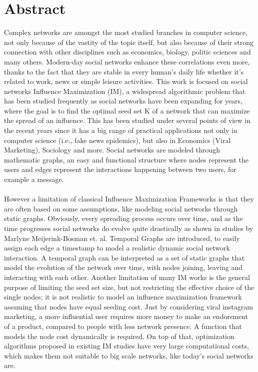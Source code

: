 \chapter*{Abstract} %
\label{abtract}

Complex networks are amongst the most studied branches in computer science, not only because of the vastity of the topic itself, but also because of their strong connection with other disciplines such as economics, biology, politic sciences and many others. Modern-day social networks enhance these correlations even more, thanks to the fact that they are stable in every human's daily life whether it's related to work, news or simple leisure activities. This work is focused on social networks Influence Maximization (IM), a widespread algorithmic problem that has been studied frequently as social networks have been expanding for years, where the goal is to find the optimal seed set K of a network that can maximize the spread of an influence. This has been studied under several points of view in the recent years since it has a big range of practical applications not only in computer science (i.e., fake news epidemics), but also in Economics (Viral Marketing), Sociology and more. 
Social networks are modeled through mathematic graphs, an easy and functional structure where nodes represent the users and edges represent the interactions happening between two users, for example a message.
\\
\\
However a limitation of classical Influence Maximization Frameworks is that they are often based on some assumptions, like modeling social networks through static graphs. Obviously, every spreading process occurs over time, and as the time progresses social networks do evolve quite drastically as shown in studies by Marlyne Meijerink-Bosman et. al. Temporal Graphs are introduced, to easily assign each edge a timestamp to model a realistic dynamic social network interaction. A temporal graph can be interpreted as a set of static graphs that model the evolution of the network over time, with nodes joining, leaving and interacting with each other. Another limitation of many IM works is the general purpose of limiting the seed set size, but not restricting the effective choice of the single nodes; it is not realistic to model an influence maximization framework assuming that nodes have equal seeding cost. Just by considering viral instagram marketing, a more influential user requires more money to make an endorsment of a product, compared to people with less network presence. A function that models the node cost dynamically is required. On top of that, optimization algorithms proposed in existing IM studies have very large computational costs, which makes them not suitable to big scale networks, like today's social networks are.
